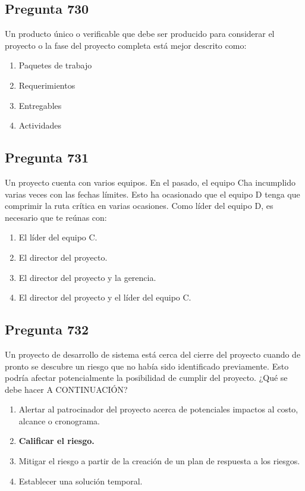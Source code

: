\documentclass[11pt,a4paper]{article}
\begin{document}
\subsection*{Pregunta 730}
Un producto único o verificable que debe ser producido para considerar el proyecto o la fase del proyecto completa está mejor descrito como:

\begin{enumerate}[label=\alph*)]
  \item Paquetes de trabajo
  \item Requerimientos
  \item Entregables
  \item Actividades
\end{enumerate}

\subsection*{Pregunta 731}
Un proyecto cuenta con varios equipos. En el pasado, el equipo Cha incumplido varias veces con las fechas límites. Esto ha ocasionado que el equipo D tenga que comprimir la ruta crítica en varias ocasiones. Como líder del equipo D, es necesario que te reúnas con:

\begin{enumerate}[label=\alph*)]
  \item El líder del equipo C.
  \item El director del proyecto.
  \item El director del proyecto y la gerencia.
  \item El director del proyecto y el líder del equipo C.
\end{enumerate}

\subsection*{Pregunta 732}
Un proyecto de desarrollo de sistema está cerca del cierre del proyecto cuando de pronto se descubre un riesgo que no había sido identificado previamente. Esto podría afectar potencialmente la posibilidad de cumplir del proyecto. ¿Qué se debe hacer A CONTINUACIÓN?

\begin{enumerate}[label=\alph*)]
  \item Alertar al patrocinador del proyecto acerca de potenciales impactos al costo, alcance o cronograma.
  \item \textbf{Calificar el riesgo.}
  \item Mitigar el riesgo a partir de la creación de un plan de respuesta a los riesgos.
  \item Establecer una solución temporal.
\end{enumerate}
\end{document}
